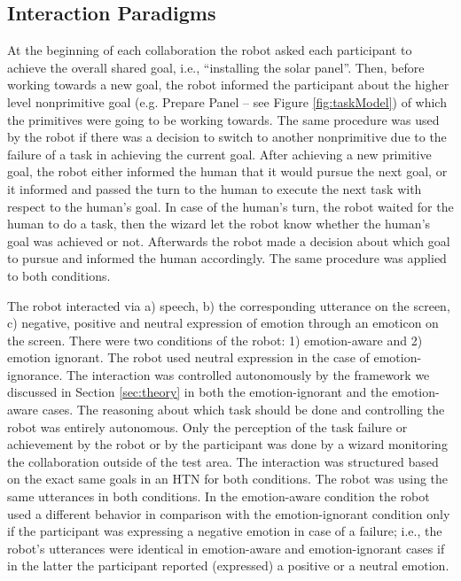\documentclass[12pt]{report}
\begin{document}
\subsection{Interaction Paradigms}
\label{sec-interaction-paradigms}
At the beginning of each collaboration the robot asked each participant to
achieve the overall shared goal, i.e., ``installing the solar panel''. Then,
before working towards a new goal, the robot informed the participant about the
higher level nonprimitive goal (e.g. Prepare Panel -- see Figure
\ref{fig:taskModel}) of which the primitives were going to be working towards.
The same procedure was used by the robot if there was a decision to switch to
another nonprimitive due to the failure of a task in achieving the current goal.
After achieving a new primitive goal, the robot either informed the human that
it would pursue the next goal, or it informed and passed the turn to the human
to execute the next task with respect to the human's goal. In case of the
human's turn, the robot waited for the human to do a task, then the wizard let
the robot know whether the human's goal was achieved or not. Afterwards the
robot made a decision about which goal to pursue and informed the human
accordingly. The same procedure was applied to both conditions.

The robot interacted via a) speech, b) the corresponding utterance on the
screen, c) negative, positive and neutral expression of emotion through an
emoticon on the screen. There were two conditions of the robot: 1)
emotion-aware and 2) emotion ignorant. The robot used neutral expression in the
case of emotion-ignorance. The interaction was controlled autonomously by the
framework we discussed in Section \ref{sec:theory} in both the emotion-ignorant
and the emotion-aware cases. The reasoning about which task should be done and
controlling the robot was entirely autonomous. Only the perception of the task
failure or achievement by the robot or by the participant was done by a wizard
monitoring the collaboration outside of the test area. The interaction was
structured based on the exact same goals in an HTN for both conditions. The
robot was using the same utterances in both conditions. In the emotion-aware
condition the robot used a different behavior in comparison with the
emotion-ignorant condition only if the participant was expressing a negative
emotion in case of a failure; i.e., the robot's utterances were identical in
emotion-aware and emotion-ignorant cases if in the latter the participant
reported (expressed) a positive or a neutral emotion.
\end{document}
